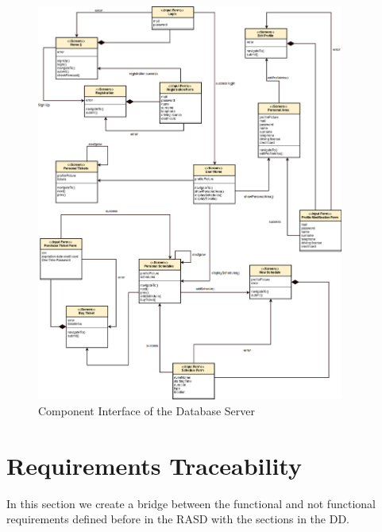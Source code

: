 \documentclass[numbers=noenddot, 12pt, a4paper, oneside]{scrbook}
\begin{document}
\begin{figure}[H]
	\centering
	\includegraphics[width=0.9\textwidth]{images/UXDiagram2}
	\caption{Component Interface of the Database Server}
\end{figure}

\chapter{Requirements Traceability}

In this section we create a bridge between the functional and not functional requirements defined before in the RASD with the sections in the DD.\\
\end{document}
